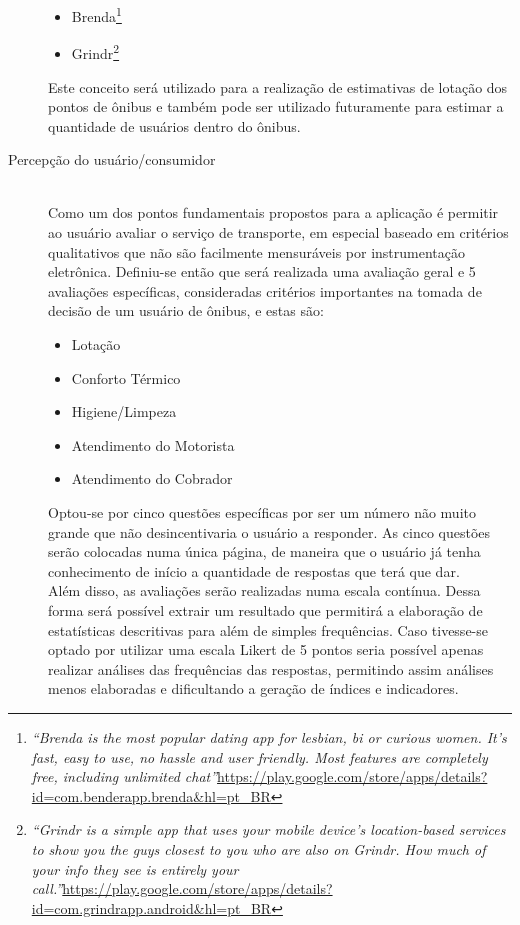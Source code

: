 \begin{description}
\begin{itemize}
	    \item Brenda\footnote{\textit{``Brenda is the most popular dating app for lesbian, bi or curious women. It's fast, easy to use, no hassle and user friendly. Most features are completely free, including unlimited chat''}\url{https://play.google.com/store/apps/details?id=com.benderapp.brenda&hl=pt_BR}}
	    \item Grindr\footnote{\textit{``Grindr is a simple app that uses your mobile device’s location-based services to show you the guys closest to you who are also on Grindr. How much of your info they see is entirely your call.''}\url{https://play.google.com/store/apps/details?id=com.grindrapp.android&hl=pt_BR}}
	    \end{itemize}
	    Este conceito será utilizado para a realização de estimativas de lotação dos pontos de ônibus e também pode ser utilizado futuramente para estimar a quantidade de usuários dentro do ônibus.%
%
\clearpage
	\item[Percepção do usuário/consumidor]\cite{Lai1995,Almeida2011,Almeida2007,andrade2008constructos} \hfill \\
	    Como um dos pontos fundamentais propostos para a aplicação é permitir ao usuário avaliar o serviço de transporte, em especial baseado em critérios qualitativos que não são facilmente mensuráveis por instrumentação eletrônica. Definiu-se então que será realizada uma avaliação geral e 5 avaliações específicas, consideradas critérios importantes na tomada de decisão de um usuário de ônibus, e estas são:
	    \begin{itemize}
	    \item Lotação
	    \item Conforto Térmico
	    \item Higiene/Limpeza
	    \item Atendimento do Motorista
	    \item Atendimento do Cobrador
	    \end{itemize}
	    Optou-se por cinco questões específicas por ser um número não muito grande que não desincentivaria o usuário a responder. As cinco questões serão colocadas numa única página, de maneira que o usuário já tenha conhecimento de início a quantidade de respostas que terá que dar.\\
	    Além disso, as avaliações serão realizadas numa escala contínua. Dessa forma será possível extrair um resultado que permitirá a elaboração de estatísticas descritivas para além de simples frequências. Caso tivesse-se optado por utilizar uma escala Likert de 5 pontos seria possível apenas realizar análises das frequências das respostas, permitindo assim análises menos elaboradas e dificultando a geração de índices e indicadores.\cite{favero2009}%

\end{description}
